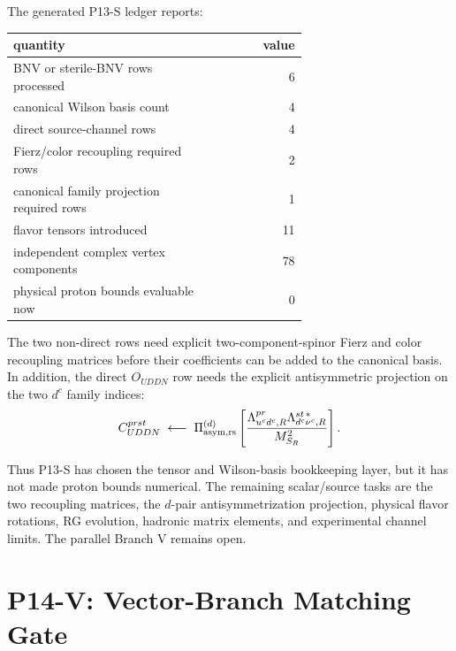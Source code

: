 \documentclass[11pt]{article}
\newcommand{\uc}{u^c}
\newcommand{\dc}{d^c}
\newcommand{\nuc}{\nu^c}
\begin{document}
The generated P13-S ledger reports:
\begin{center}
\small
\begin{tabular}{p{0.66\linewidth}r}
\toprule
quantity & value\\
\midrule
BNV or sterile-BNV rows processed & 6\\
canonical Wilson basis count & 4\\
direct source-channel rows & 4\\
Fierz/color recoupling required rows & 2\\
canonical family projection required rows & 1\\
flavor tensors introduced & 11\\
independent complex vertex components & 78\\
physical proton bounds evaluable now & 0\\
\bottomrule
\end{tabular}
\end{center}
The two non-direct rows need explicit two-component-spinor Fierz and color
recoupling matrices before their coefficients can be added to the canonical
basis.  In addition, the direct $O_{UDDN}$ row needs the explicit
antisymmetric projection on the two $\dc$ family indices:
\begin{equation}
  C_{UDDN}^{prst}
  \;\longleftarrow\;
  \Pi^{(d)}_{\rm asym,rs}
  \left[
  \frac{\Lambda_{\uc\dc,R}^{pr}
  \Lambda_{\dc\nuc,R}^{st\,\ast}}{M_{S_R}^2}
  \right].
\end{equation}

Thus P13-S has chosen the tensor and Wilson-basis bookkeeping layer, but it has
not made proton bounds numerical.  The remaining scalar/source tasks are the
two recoupling matrices, the $d$-pair antisymmetrization projection, physical
flavor rotations, RG evolution, hadronic matrix elements, and experimental
channel limits.  The parallel Branch V remains open.

\section{P14-V: Vector-Branch Matching Gate}
\end{document}
